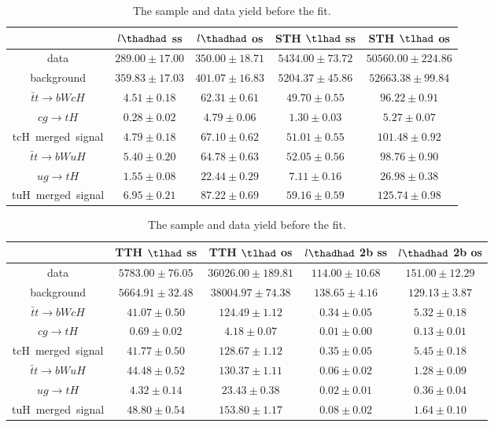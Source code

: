 \begin{table}
\footnotesize
\caption{The sample and data yield before the fit.}
\centering
\begin{tabular}{|c|c|c|c|c|} \hline
 & $l\thadhad$ ss & $l\thadhad$ os & STH $\tlhad$ ss & STH $\tlhad$ os\\\hline
data & $289.00\pm17.00$ & $350.00\pm18.71$ & $5434.00\pm73.72$ & $50560.00\pm224.86$\\\hline
background & $359.83\pm17.03$ & $401.07\pm16.83$ & $5204.37\pm45.86$ & $52663.38\pm99.84$\\\hline
$\bar{t}t\to bWcH$ & $4.51\pm0.18$ & $62.31\pm0.61$ & $49.70\pm0.55$ & $96.22\pm0.91$\\\hline
$cg\to tH$ & $0.28\pm0.02$ & $4.79\pm0.06$ & $1.30\pm0.03$ & $5.27\pm0.07$\\\hline
tcH~merged~signal & $4.79\pm0.18$ & $67.10\pm0.62$ & $51.01\pm0.55$ & $101.48\pm0.92$\\\hline
$\bar{t}t\to bWuH$ & $5.40\pm0.20$ & $64.78\pm0.63$ & $52.05\pm0.56$ & $98.76\pm0.90$\\\hline
$ug\to tH$ & $1.55\pm0.08$ & $22.44\pm0.29$ & $7.11\pm0.16$ & $26.98\pm0.38$\\\hline
tuH~merged~signal & $6.95\pm0.21$ & $87.22\pm0.69$ & $59.16\pm0.59$ & $125.74\pm0.98$\\\hline
\end{tabular}
\begin{tabular}{|c|c|c|c|c|} \hline
 & TTH $\tlhad$ ss & TTH $\tlhad$ os & $l\thadhad$ 2b ss & $l\thadhad$ 2b os\\\hline
data & $5783.00\pm76.05$ & $36026.00\pm189.81$ & $114.00\pm10.68$ & $151.00\pm12.29$\\\hline
background & $5664.91\pm32.48$ & $38004.97\pm74.38$ & $138.65\pm4.16$ & $129.13\pm3.87$\\\hline
$\bar{t}t\to bWcH$ & $41.07\pm0.50$ & $124.49\pm1.12$ & $0.34\pm0.05$ & $5.32\pm0.18$\\\hline
$cg\to tH$ & $0.69\pm0.02$ & $4.18\pm0.07$ & $0.01\pm0.00$ & $0.13\pm0.01$\\\hline
tcH~merged~signal & $41.77\pm0.50$ & $128.67\pm1.12$ & $0.35\pm0.05$ & $5.45\pm0.18$\\\hline
$\bar{t}t\to bWuH$ & $44.48\pm0.52$ & $130.37\pm1.11$ & $0.06\pm0.02$ & $1.28\pm0.09$\\\hline
$ug\to tH$ & $4.32\pm0.14$ & $23.43\pm0.38$ & $0.02\pm0.01$ & $0.36\pm0.04$\\\hline
tuH~merged~signal & $48.80\pm0.54$ & $153.80\pm1.17$ & $0.08\pm0.02$ & $1.64\pm0.10$\\\hline

\end{tabular}
\end{table}
